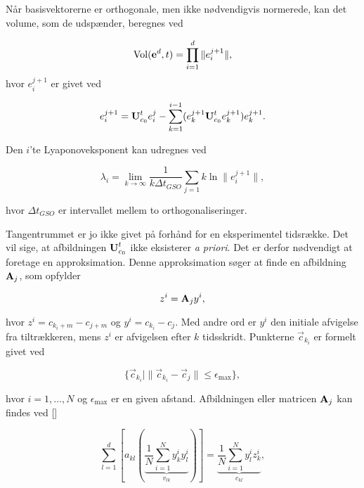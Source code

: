 \vspace{4.0mm}
N{\aa}r basisvektorerne er orthogonale, men ikke
n{\o}dvendigvis normerede, kan det volume, som de
udsp{\ae}nder, beregnes ved

\begin{equation}
  {\rm Vol}(\mbox{${\bf e}$}^d, t) = \prod_{i=1}^d \|e_i^{j+1}\|,
\end{equation}
hvor $e_i^{j+1}$ er givet ved

\[
  e_i^{j+1} = \mbox{${\bf U}$}_{c_0}^te_i^j - \sum_{k=1}^{i-1}(e_k^{j+1}
\mbox{${\bf U}$}_{c_0}^t e_k^{j+1}) e_k^{j+1}.
\]

Den $i$'te Lyaponoveksponent kan udregnes ved

\begin{equation}
  \lambda_i = \lim_{k\rightarrow\infty}\frac{1}{k\Delta
t_{GSO}}\sum_{j=1}{k} \ln \| e_i^{j+1} \|,
\end{equation}

hvor $\Delta t_{GSO}$ er intervallet mellem to
orthogonaliseringer.

\vspace{4.0mm}
Tangentrummet er jo ikke givet p{\aa} forh{\aa}nd for en
eksperimentel tidsr{\ae}kke. Det vil sige, at afbildningen
$\mbox{${\bf U}$}_{c_0}^t$ ikke eksisterer {\em a priori}. Det er
derfor n{\o}d\-ven\-digt at foretage en approksimation.
Denne approksimation s{\o}ger at finde en afbildning
$\mbox{${\bf A}$}_j$, som opfylder

\begin{equation}
  z^i = \mbox{${\bf A}$}_j y^i,
\end{equation}

hvor $z^i = c_{k_i+m} - c_{j+m}$ og $y^i = c_{k_i} - c_j$.
Med andre ord er $y^i$ den initiale afvigelse fra
tiltr{\ae}kkeren, mens $z^i$ er afvigelsen efter $k$
tidsskridt. Punkterne $\vec{c}_{k_i}$ er formelt givet ved

\begin{equation}
  \{ \vec{c}_{k_i} | \|\vec{c}_{k_i} - \vec{c}_j\| \le
  \epsilon_{\mbox{max}} \},
\end{equation}

hvor $i=1,\ldots,N$ og $\epsilon_{\mbox{max}}$ er en given
afstand. Afbildningen eller matricen $\mbox{${\bf A}$}_j$ kan
findes ved []

\begin{equation}
  \sum_{l=1}^d \left[ a_{kl} \left(\underbrace{\frac{1}{N}\sum_{i=1}^N
y_k^i y_l^i}_{v_{lk}} \right) \right] =
\underbrace{\frac{1}{N}\sum_{i=1}^Ny_l^i z_k^i}_{c_{kl}},
\end{equation}

